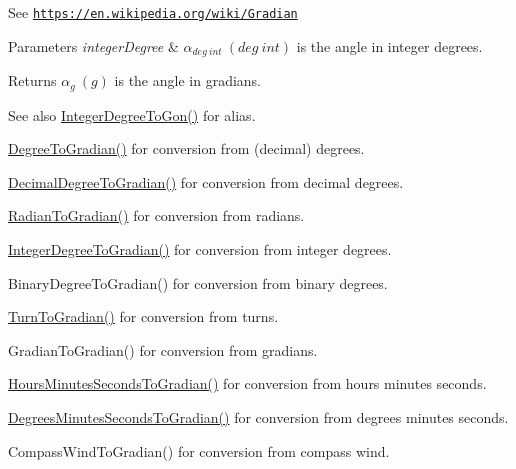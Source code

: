 See \href{https://en.wikipedia.org/wiki/Gradian}{\tt https\+://en.\+wikipedia.\+org/wiki/\+Gradian} 
\begin{DoxyParams}{Parameters}
{\em integer\+Degree} & $\alpha_{deg\ int}\ (deg\ int)$ is the angle in integer degrees. \\
\hline
\end{DoxyParams}
\begin{DoxyReturn}{Returns}
$\alpha_{g}\ (g)$ is the angle in gradians. 
\end{DoxyReturn}
\begin{DoxySeeAlso}{See also}
\mbox{\hyperlink{group___e_g_x_math-_angle_conversions-_integer_degree_ga6e5be425c37ad27319f09329156c64bb}{Integer\+Degree\+To\+Gon()}} for alias. 

\mbox{\hyperlink{group___e_g_x_math-_angle_conversions-_degree_ga25bb5506b3f66fff7a1b85bf7bd795b3}{Degree\+To\+Gradian()}} for conversion from (decimal) degrees. 

\mbox{\hyperlink{group___e_g_x_math-_angle_conversions-_decimal_degree_ga3ac6f1ceb36a4938cdf3b55554734c99}{Decimal\+Degree\+To\+Gradian()}} for conversion from decimal degrees. 

\mbox{\hyperlink{group___e_g_x_math-_angle_conversions-_radian_ga3c1607eae50cbf0186c42485bb3878d5}{Radian\+To\+Gradian()}} for conversion from radians. 

\mbox{\hyperlink{group___e_g_x_math-_angle_conversions-_integer_degree_ga47127467ff7a8ef57f6be9ce496a97df}{Integer\+Degree\+To\+Gradian()}} for conversion from integer degrees. 

Binary\+Degree\+To\+Gradian() for conversion from binary degrees. 

\mbox{\hyperlink{group___e_g_x_math-_angle_conversions-_turn_gad6aa9bdde2cde17cec136b24ee017bba}{Turn\+To\+Gradian()}} for conversion from turns. 

Gradian\+To\+Gradian() for conversion from gradians. 

\mbox{\hyperlink{group___e_g_x_math-_angle_conversions-_hours_minutes_seconds_ga1731e750f3e5561313ee9d22adff747e}{Hours\+Minutes\+Seconds\+To\+Gradian()}} for conversion from hours minutes seconds. 

\mbox{\hyperlink{group___e_g_x_math-_angle_conversions-_degrees_minutes_seconds_ga59e2c2b178f760c337fcb3ea7406570f}{Degrees\+Minutes\+Seconds\+To\+Gradian()}} for conversion from degrees minutes seconds. 

Compass\+Wind\+To\+Gradian() for conversion from compass wind. 
\end{DoxySeeAlso}
\mbox{\label{group___e_g_x_math-_angle_conversions-_integer_degree_gae6b79bd5a92f8c6942b9fc2c50695e6a}} 

